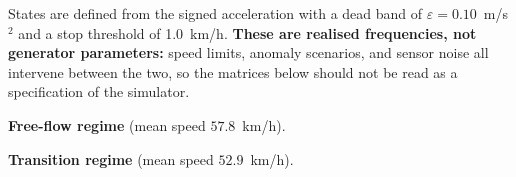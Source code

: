 \documentclass[journal]{IEEEtran}
\begin{document}
States are defined from the signed acceleration with a dead band of $\varepsilon = 0.10$~m/s$^2$ and a stop threshold of 1.0~km/h. \textbf{These are realised frequencies, not generator parameters:} speed limits, anomaly scenarios, and sensor noise all intervene between the two, so the matrices below should not be read as a specification of the simulator.

\textbf{Free-flow regime} (mean speed $57.8$~km/h).

\begin{table}[!t]
  \caption{\textbf{[Realised frequencies, free-flow regime, anomaly-labelled rows excluded]}~ First-order transitions between kinematic states. These are frequencies observed in the released trajectories, not generator parameters.}
  \label{tab:markov_free}
  \centering
  \footnotesize
\end{table}


\vspace{1em}

\textbf{Transition regime} (mean speed $52.9$~km/h).

\begin{table}[!t]
  \caption{\textbf{[Realised frequencies, transition regime, anomaly-labelled rows excluded]}~ First-order transitions between kinematic states.}
  \label{tab:markov_trans}
  \centering
  \footnotesize
\end{table}
\end{document}
